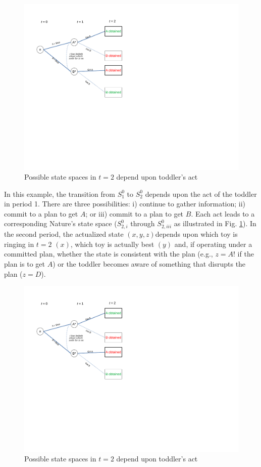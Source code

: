 \documentclass[
11pt,
titlepage,
reqno,
]{article}%
\theoremstyle{definition}
\begin{document}
\begin{figure}[h!]
	\centering
	\includegraphics*[page=16,trim = 0in 5in 1in 0in,scale=.65]{Awareness_Diagrams_All}
	\caption{Possible state spaces in $t=2$ depend upon toddler's act\label{Diag: p-16}}%
\end{figure}

In this example, the transition from $S^0_1$ to $S^0_2$ depends upon the act of the toddler in period 1. There are three possibilities: i) continue to gather information; ii) commit to a plan to get $A$; or iii) commit to a plan to get $B$. Each act leads to a corresponding Nature's state space ($S^0_{2,i}$ through $S^0_{2,iii}$ as illustrated in Fig. \ref{Diag: p-16}). In the second period, the actualized state $(x,y,z) $depends upon which toy is ringing in $t=2$ $(x)$,  which toy is actually best $(y)$ and, if operating under a committed plan, whether the state is consistent with the plan (e.g., $z=A!$ if the plan is to get $A$) or the toddler becomes aware of something that disrupts the plan ($z=D$).

\begin{figure}[h!]
	\centering
	\includegraphics*[page=17,trim = 0in 0in 0in 0in,scale=.65]{Awareness_Diagrams_All}
	\caption{Possible state spaces in $t=2$ depend upon toddler's act\label{Diag: p-17}}%
\end{figure}
\end{document}
